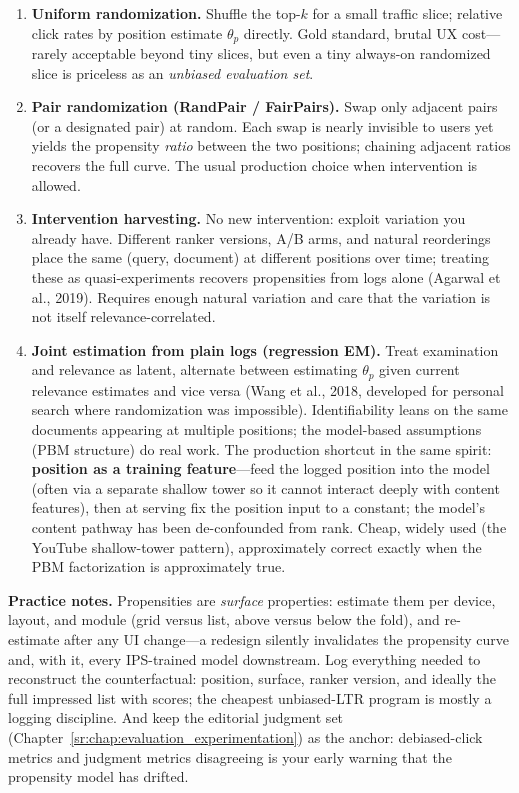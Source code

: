 \begin{enumerate}
    \item \textbf{Uniform randomization.} Shuffle the top-$k$ for a small traffic slice; relative click rates by position estimate $\theta_p$ directly. Gold standard, brutal UX cost---rarely acceptable beyond tiny slices, but even a tiny always-on randomized slice is priceless as an \textit{unbiased evaluation set}.
    \item \textbf{Pair randomization (RandPair / FairPairs).} Swap only adjacent pairs (or a designated pair) at random. Each swap is nearly invisible to users yet yields the propensity \textit{ratio} between the two positions; chaining adjacent ratios recovers the full curve. The usual production choice when intervention is allowed.
    \item \textbf{Intervention harvesting.} No new intervention: exploit variation you already have. Different ranker versions, A/B arms, and natural reorderings place the same (query, document) at different positions over time; treating these as quasi-experiments recovers propensities from logs alone (Agarwal et al., 2019). Requires enough natural variation and care that the variation is not itself relevance-correlated.
    \item \textbf{Joint estimation from plain logs (regression EM).} Treat examination and relevance as latent, alternate between estimating $\theta_p$ given current relevance estimates and vice versa (Wang et al., 2018, developed for personal search where randomization was impossible). Identifiability leans on the same documents appearing at multiple positions; the model-based assumptions (PBM structure) do real work. The production shortcut in the same spirit: \textbf{position as a training feature}---feed the logged position into the model (often via a separate shallow tower so it cannot interact deeply with content features), then at serving fix the position input to a constant; the model's content pathway has been de-confounded from rank. Cheap, widely used (the YouTube shallow-tower pattern), approximately correct exactly when the PBM factorization is approximately true.
\end{enumerate}

\textbf{Practice notes.} Propensities are \textit{surface} properties: estimate them per device, layout, and module (grid versus list, above versus below the fold), and re-estimate after any UI change---a redesign silently invalidates the propensity curve and, with it, every IPS-trained model downstream. Log everything needed to reconstruct the counterfactual: position, surface, ranker version, and ideally the full impressed list with scores; the cheapest unbiased-LTR program is mostly a logging discipline. And keep the editorial judgment set (Chapter~\ref{sr:chap:evaluation_experimentation}) as the anchor: debiased-click metrics and judgment metrics disagreeing is your early warning that the propensity model has drifted.

